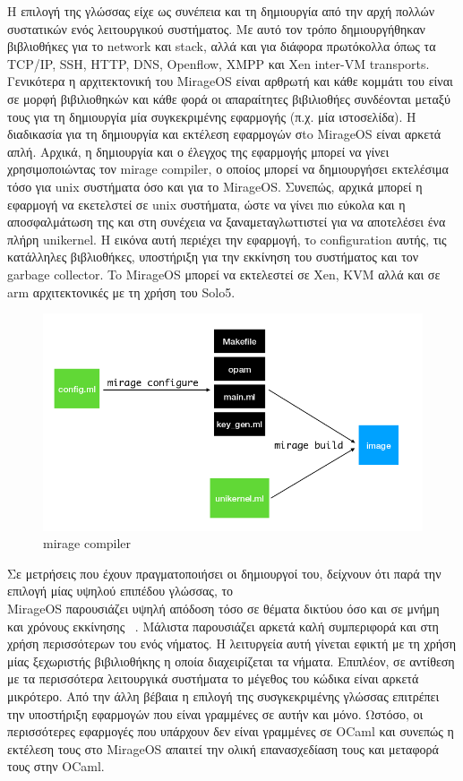 Η επιλογή της γλώσσας είχε ως συνέπεια και τη δημιουργία από την αρχή πολλών
συστατικών ενός λειτουργικού συστήματος. Με αυτό τον τρόπο δημιουργήθηκαν
βιβλιοθήκες για το network και  stack, αλλά και για διάφορα πρωτόκολλα
όπως τα TCP/IP, SSH, HTTP, DNS, Openflow, XMPP και Xen inter-VM transports.
Γενικότερα η αρχιτεκτονική του MirageOS είναι αρθρωτή και κάθε κομμάτι του είναι
σε μορφή βιβιλιοθηκών και κάθε φορά οι απαραίτητες βιβιλιοθήες συνδέονται μεταξύ
τους για τη δημιουργία μία συγκεκριμένης εφαρμογής (π.χ. μία ιστοσελίδα). H
διαδικασία για τη δημιουργία και εκτέλεση εφαρμογών σto MirageOS είναι αρκετά
απλή. Αρχικά, η δημιουργία και ο έλεγχος της εφαρμογής μπορεί να γίνει
χρησιμοποιώντας τον mirage compiler, ο οποίος μπορεί να δημιουργήσει εκτελέσιμα
τόσο για unix συστήματα όσο και για το MirageOS. Συνεπώς, αρχικά μπορεί η
εφαρμογή να εκετελστεί σε unix συστήματα, ώστε να γίνει πιο εύκολα και η
αποσφαλμάτωση της και στη συνέχεια να ξαναμεταγλωττιστεί για να αποτελέσει ένα
πλήρη unikernel. Η εικόνα αυτή περιέχει την εφαρμογή, τo configuration
αυτής, τις κατάλληλες βιβλιοθήκες, υποστήριξη για την εκκίνηση του συστήματος
και τον garbage collector. To MirageOS μπορεί να εκτελεστεί σε Xen, KVM αλλά και
σε arm αρχιτεκτονικές με τη χρήση του Solo5. 

\begin{figure}[htp]
\centering
\includegraphics[scale=0.5]{figures/mirage_compiler.png}
\caption{mirage compiler\label{fig3_7}}
\end{figure}

Σε μετρήσεις που έχουν πραγματοποιήσει οι δημιουργοί του, δείχνουν ότι παρά την
επιλογή μίας υψηλού επιπέδου γλώσσας, το \\MirageOS παρουσιάζει υψηλή απόδοση τόσο
σε θέματα δικτύου όσο και σε μνήμη και χρόνους εκκίνησης
~\cite{madhavapeddy2013unikernels}. Μάλιστα παρουσιάζει αρκετά καλή συμπεριφορά
και στη χρήση περισσότερων του ενός νήματος. Η λειτυργεία αυτή γίνεται εφικτή με
τη χρήση μίας ξεχωριστής βιβιλιοθήκης η οποία διαχειρίζεται τα νήματα. Επιπλέον,
σε αντίθεση με τα περισσότερα λειτουργικά συστήματα το μέγεθος του κώδικα είναι
αρκετά μικρότερο. Από την άλλη βέβαια η επιλογή της συσγκεκριμένης γλώσσας
επιτρέπει την υποστήριξη εφαρμογών που είναι γραμμένες σε αυτήν και μόνο.
Ωστόσο, οι περισσότερες εφαρμογές που υπάρχουν δεν είναι γραμμένες σε OCaml και
συνεπώς η εκτέλεση τους στο MirageOS απαιτεί την ολική επανασχεδίαση τους και
μεταφορά τους στην OCaml.

